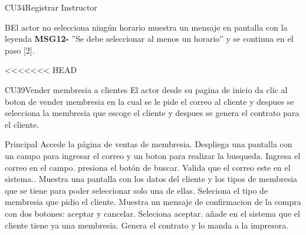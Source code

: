 \begin{UseCase}{CU34}{Registrar Instructor}
{\begin{UCtrayectoriaA}{B}{El actor no selecciona ningún horario}
	\UCpaso muestra un mensaje en pantalla con la leyenda {\bf MSG12-} ''Se debe seleccionar al menos un horario'' y se continua en el paso [2].
\end{UCtrayectoriaA}


<<<<<<< HEAD



\begin{UseCase}{CU39}{Vender membresia a clientes}{
		El actor desde su pagina de inicio da clic al boton de vender membresia en la cual se le pide el correo al cliente y despues se selecciona la membresia que escoge el cliente y despues se genera el contrato para el cliente.}
\end{UseCase}

\begin{UCtrayectoria}{Principal}
	\UCpaso[\UCactor] Accede la página de ventas de membresia.
	\UCpaso Despliega una pantalla con un campo para ingresar el correo y un boton para realizar la busqueda.
	\UCpaso[\UCactor] Ingresa el correo en el campo.  
	\UCpaso[\UCactor] presiona el botón de buscar.
	\UCpaso Valida que el correo este en el sistema..
	\UCpaso Muestra una pantalla con los datos del cliente y los tipos de membresia que se tiene para poder seleccionar solo una de ellas.
	\UCpaso [\UCactor] Seleciona el tipo de membresia que pidio el cliente.
	\UCpaso Muestra un mensaje de confirmacion de la compra con dos botones: aceptar y cancelar.
	\UCpaso[\UCactor] Seleciona aceptar.
	\UCpaso añade en el sistema que el cliente tiene ya una membresia.
	\UCpaso Genera el contrato y lo manda a la impresora.
\end{UCtrayectoria}

}
\end{UseCase}
